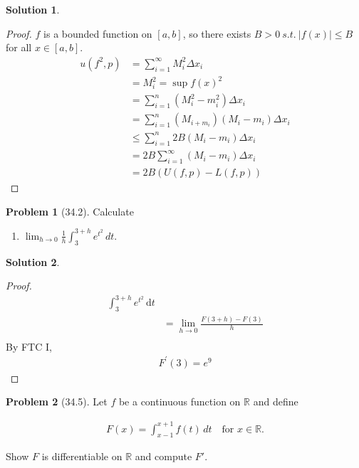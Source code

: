 \documentclass[12pt]{article}
\theoremstyle{definition} %
\newtheorem{solution}{Solution}
\newtheorem{problem}{Problem}
\theoremstyle{plain} %
\begin{document}
\begin{solution}
    \begin{proof}
        $f$ is a bounded function on $[a,b]$, so there exists $B>0 \ s.t. \ \left\vert f(x) \right\vert \leq B$ for all $x\in[a,b]$.
        \begin{align}
            u(f^{2},p) &= \sum_{i=1}^{\infty} M_i^{2}\Delta x_{i} \\[10pt] 
            &= M_i^{2} = \sup f(x)^{2} \\[10pt] 
            &= \sum_{i=1}^{n} \left( M_i^{2}-m_i^{2} \right)\Delta x_i \\[10pt] 
            &= \sum_{i=1}^{n} \left( M_{i+m_i}  \right)\left( M_{i} - m_i \right)\Delta x_{i} \\[10pt] 
            &\leq \sum_{i=1}^{n} 2B\left( M_{i}-m_{i} \right)\Delta x_{i} \\[10pt] 
            &= 2B \sum_{i=1}^{\infty} \left( M_i - m_i \right)\Delta x_{i} \\[10pt] 
            &= 2B \left( U(f,p)-L(f,p) \right) 
        \end{align} 
    \end{proof}
\end{solution}
\begin{problem}[34.2]
    \noindent Calculate

\begin{enumerate}
    \item $ \lim_{h \to 0} \frac{1}{h} \int_3^{3+h} e^{t^2} \, dt $.
\end{enumerate}
\end{problem}
\begin{solution}
   \begin{proof}
    \begin{align}
        \int_{3}^{3+h}e^{t^{2}} \,\mathrm{d}t \\[10pt] 
        &= \lim_{h \to 0} \frac{F(3+h)-F(3)}{h}\\[10pt] 
    \end{align}
    By FTC I,
    \begin{align}
        F^\prime (3)  = e^{9} 
    \end{align}
   \end{proof} 
\end{solution}
\begin{problem}[34.5]
    \noindent  Let $ f $ be a continuous function on $ \mathbb{R} $ and define

\begin{align}    
F(x) = \int_{x-1}^{x+1} f(t) \, dt \quad \text{for } x \in \mathbb{R}.
\end{align}

Show $ F $ is differentiable on $ \mathbb{R} $ and compute $ F' $.
\end{problem}
\end{document}
